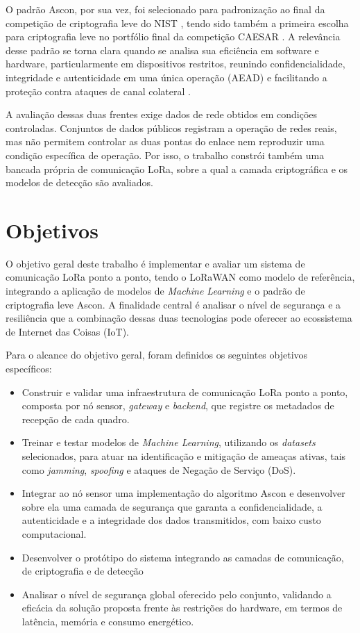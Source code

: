 O padrão Ascon, por sua vez, foi selecionado para padronização ao final da competição de criptografia leve do NIST \cite{nistir8454}, tendo sido também a primeira escolha para criptografia leve no portfólio final da competição CAESAR \cite{caesar_submissions}. A relevância desse padrão se torna clara quando se analisa sua eficiência em software e hardware, particularmente em dispositivos restritos, reunindo confidencialidade, integridade e autenticidade em uma única operação (AEAD) e facilitando a proteção contra ataques de canal colateral \cite{ascon_official}.

A avaliação dessas duas frentes exige dados de rede obtidos em condições controladas. Conjuntos de dados públicos registram a operação de redes reais, mas não permitem controlar as duas pontas do enlace nem reproduzir uma condição específica de operação. Por isso, o trabalho constrói também uma bancada própria de comunicação LoRa, sobre a qual a camada criptográfica e os modelos de detecção são avaliados.



\section{Objetivos}
O objetivo geral deste trabalho é implementar e avaliar um sistema de comunicação LoRa ponto a ponto, tendo o LoRaWAN como modelo de referência, integrando a aplicação de modelos de \textit{Machine Learning} e o padrão de criptografia leve Ascon. A finalidade central é analisar o nível de segurança e a resiliência que a combinação dessas duas tecnologias pode oferecer ao ecossistema de Internet das Coisas (IoT).

Para o alcance do objetivo geral, foram definidos os seguintes objetivos específicos:

\begin{itemize}
    \item Construir e validar uma infraestrutura de comunicação LoRa ponto a ponto, composta por nó sensor, \textit{gateway} e \textit{backend}, que registre os metadados de recepção de cada quadro.
    \item Treinar e testar modelos de \textit{Machine Learning}, utilizando os \textit{datasets} selecionados, para atuar na identificação e mitigação de ameaças ativas, tais como \textit{jamming}, \textit{spoofing} e ataques de Negação de Serviço (DoS).
    \item Integrar ao nó sensor uma implementação do algoritmo Ascon e desenvolver sobre ela uma camada de segurança que garanta a confidencialidade, a autenticidade e a integridade dos dados transmitidos, com baixo custo computacional.
    \item Desenvolver o protótipo do sistema integrando as camadas de comunicação, de criptografia e de detecção
    \item Analisar o nível de segurança global oferecido pelo conjunto, validando a eficácia da solução proposta frente às restrições do hardware, em termos de latência, memória e consumo energético.
\end{itemize}

